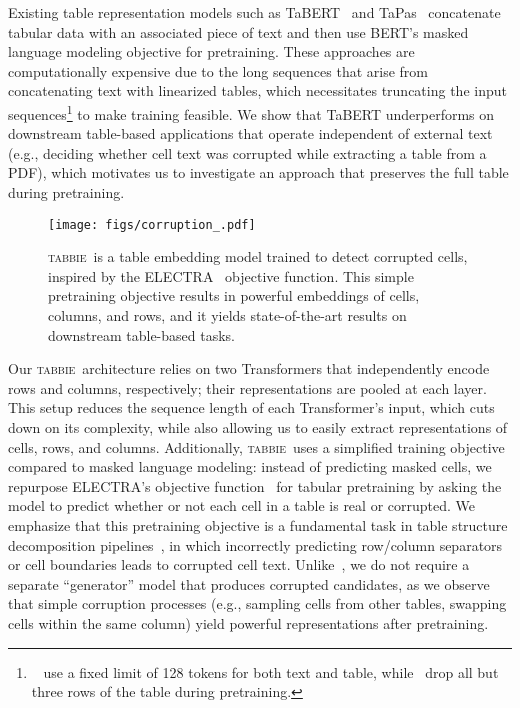 \documentclass[11pt]{article}
\newcommand{\name}[0]{\textsc{tabbie}}
\begin{document}
Existing table representation models such as TaBERT~\citep{yin20acl} and TaPas~\citep{Herzig2020TAPASWS} concatenate tabular data with an associated piece of text and then use BERT's masked language modeling objective for pretraining. These approaches are computationally expensive due to the long sequences that arise from concatenating text with linearized tables, which necessitates truncating the input sequences\footnote{~\citet{Herzig2020TAPASWS} use a fixed limit of 128 tokens for both text and table, while~\citet{yin20acl} drop all but three rows of the table during pretraining.} to make training feasible. We show that TaBERT underperforms on downstream table-based applications that operate independent of external text (e.g., deciding whether cell text was corrupted while extracting a table from a PDF), which motivates us to investigate an approach that preserves the full table during pretraining.


\makeatother
\begin{figure}[t]
    \centering
  \texttt{[image: figs/corruption\_.pdf]}
  \caption{\name\ is a table embedding model trained to detect corrupted cells, inspired by the ELECTRA~\citep{Clark2020ELECTRA:} objective function. This simple pretraining objective results in powerful embeddings of cells, columns, and rows, and it yields state-of-the-art results on downstream table-based tasks.}
  \label{fig:overview}
\end{figure}
 

Our \name\ architecture relies on two Transformers that independently encode rows and columns, respectively; their representations are pooled at each layer. This setup reduces the sequence length of each Transformer's input, which cuts down on its complexity, while also allowing us to easily extract representations of cells, rows, and columns. Additionally,
\name\ uses a simplified training objective compared to masked language modeling: instead of predicting masked cells, we repurpose ELECTRA's objective function~\citep{Clark2020ELECTRA:} for tabular pretraining by asking the model to predict whether or not each cell in a table is real or corrupted. We emphasize that this pretraining objective is a fundamental task in table structure decomposition pipelines~\citep{nishida2017understanding, tensmeyer-table, raja-table}, in which incorrectly predicting row/column separators or cell boundaries leads to corrupted cell text. Unlike~\citet{Clark2020ELECTRA:}, we do not require a separate ``generator'' model that produces corrupted candidates, as we observe that simple corruption processes (e.g., sampling cells from other tables, swapping cells within the same column) yield powerful representations after pretraining. 
\end{document}
